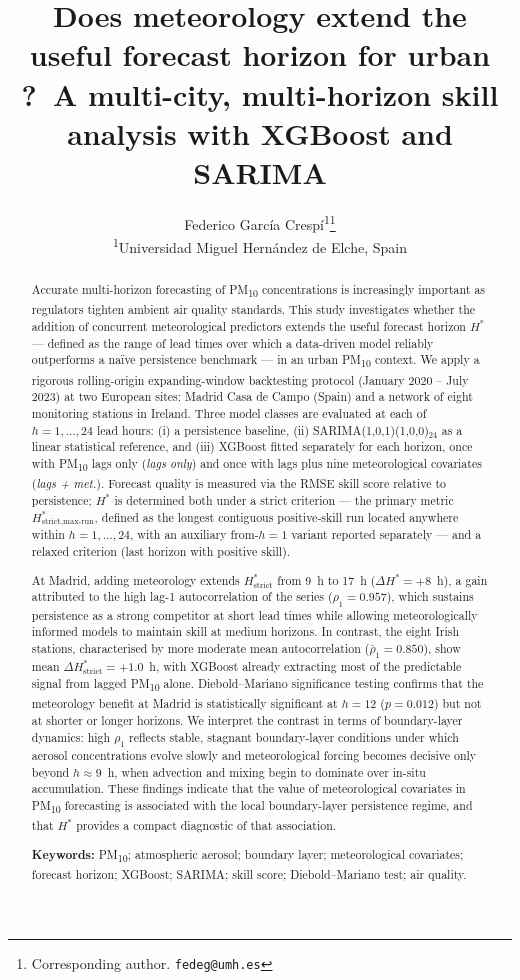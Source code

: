 \documentclass[12pt,a4paper]{article}
\title{Does meteorology extend the useful forecast horizon for urban
\PMten{}?\
A multi-city, multi-horizon skill analysis with XGBoost and SARIMA}
\author{
  Federico García Crespí\textsuperscript{1}\thanks{Corresponding author.
    \texttt{fedeg@umh.es}} \\[6pt]
  \textsuperscript{1}Universidad Miguel Hernández de Elche, Spain
}
\date{}
\newcommand{\PMten}{PM\textsubscript{10}}
\begin{document}
\maketitle

\begin{abstract}
\noindent
Accurate multi-horizon forecasting of \PMten{} concentrations is increasingly
important as regulators tighten ambient air quality standards.  This study
investigates whether the addition of concurrent meteorological predictors
extends the useful forecast horizon $H^*$ — defined as the range of lead times
over which a data-driven model reliably outperforms a naïve persistence
benchmark — in an urban \PMten{} context.  We apply a rigorous rolling-origin
expanding-window backtesting protocol (January 2020 -- July 2023) at two
European sites: Madrid Casa de Campo (Spain) and a network of eight monitoring
stations in Ireland.  Three model classes are evaluated at each of $h = 1,
\ldots, 24$ lead hours: (i) a persistence baseline, (ii) SARIMA(1,0,1)(1,0,0)$_{24}$
as a linear statistical reference, and (iii) XGBoost fitted separately for each
horizon, once with \PMten{} lags only (\textit{lags only}) and once with lags
plus nine meteorological covariates (\textit{lags + met.}).  Forecast quality
is measured via the RMSE skill score relative to persistence; $H^*$ is
determined both under a strict criterion --- the primary metric
$H^*_{\text{strict,max-run}}$, defined as the longest contiguous positive-skill
run located anywhere within $h = 1, \ldots, 24$, with an auxiliary from-$h{=}1$
variant reported separately --- and a relaxed criterion (last horizon with
positive skill).

At Madrid, adding meteorology extends $H^*_{\text{strict}}$ from 9~h to 17~h
($\Delta H^* = +8$~h), a gain attributed to the high lag-1 autocorrelation of
the series ($\rho_1 = 0.957$), which sustains persistence as a strong
competitor at short lead times while allowing meteorologically informed models
to maintain skill at medium horizons.  In contrast, the eight Irish stations,
characterised by more moderate mean autocorrelation ($\bar{\rho}_1 = 0.850$),
show mean $\Delta H^*_{\text{strict}} = +1.0$~h, with XGBoost already
extracting most of the predictable signal from lagged \PMten{} alone.
Diebold--Mariano significance testing confirms that the meteorology benefit at
Madrid is statistically significant at $h = 12$ ($p = 0.012$) but not at
shorter or longer horizons.  We interpret the contrast in terms of
boundary-layer dynamics: high $\rho_1$ reflects stable, stagnant
boundary-layer conditions under which aerosol concentrations evolve slowly and
meteorological forcing becomes decisive only beyond $h \approx 9$~h, when
advection and mixing begin to dominate over in-situ accumulation.  These
findings indicate that the value of meteorological covariates in \PMten{}
forecasting is associated with the local boundary-layer persistence regime, and
that $H^*$ provides a compact diagnostic of that association.

\medskip
\noindent
\textbf{Keywords:} PM\textsubscript{10}; atmospheric aerosol; boundary layer;
meteorological covariates; forecast horizon; XGBoost; SARIMA; skill score;
Diebold--Mariano test; air quality.
\end{abstract}
\end{document}
